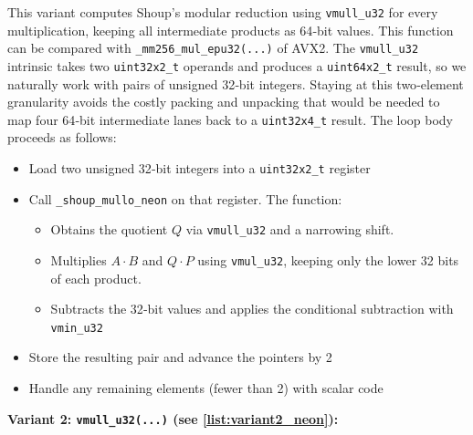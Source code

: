 \documentclass{article}
\newcommand{\pointlabel}[1]{\par\smallskip\noindent\textbf{\textcolor{accentorange}{#1:}} }
\begin{document}
This variant computes Shoup's modular reduction using \texttt{vmull\_u32} for every multiplication, keeping all intermediate products as 64‑bit values. This function can be compared with \texttt{\_mm256\_mul\_epu32(...)} of AVX2. The \texttt{vmull\_u32} intrinsic takes two \texttt{uint32x2\_t} operands and produces a \texttt{uint64x2\_t} result, so we naturally work with pairs of unsigned 32‑bit integers. Staying at this two‑element granularity avoids the costly packing and unpacking that would be needed to map four 64‑bit intermediate lanes back to a \texttt{uint32x4\_t} result. The loop body proceeds as follows:
\begin{itemize}
    \item Load two unsigned 32‑bit integers into a \texttt{uint32x2\_t} register
    \item Call \texttt{\_shoup\_mullo\_neon} on that register.  The function:
          \begin{itemize}
              \item Obtains the quotient \(Q\) via \texttt{vmull\_u32} and a narrowing shift.
              \item Multiplies \(A \cdot B\) and \(Q \cdot P\) using \texttt{vmul\_u32}, keeping only the lower 32 bits of each product.
              \item Subtracts the 32‑bit values and applies the conditional subtraction with \texttt{vmin\_u32}
          \end{itemize}
    \item Store the resulting pair and advance the pointers by 2
    \item Handle any remaining elements (fewer than 2) with scalar code
\end{itemize}

\pointlabel{Variant 2: \texttt{vmull\_u32(...)} (see \autoref{list:variant2_neon})}
\end{document}
